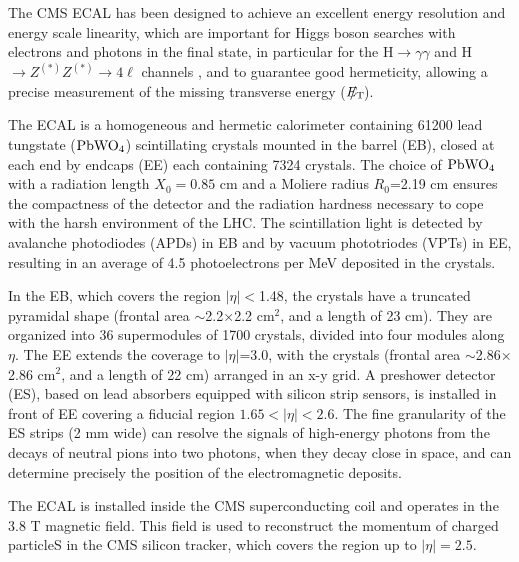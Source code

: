 \documentclass[journal]{IEEEtran}
\newcommand{\ETslash}{\ensuremath{E_{\mathrm{T}}\hspace{-1.1em}/\kern0.45em}}
\begin{document}
The CMS ECAL \cite{CMS:1997ema} has been designed to achieve an excellent energy resolution and energy scale linearity, which are important for Higgs boson searches with electrons and photons in the final state, in particular for the H$\to\gamma\gamma$ \cite{Khachatryan:2014ira} and H$\to Z^{(\ast)}Z^{(\ast)}\to 4\ell$ channels \cite{Chatrchyan:2013mxa}, and to guarantee good hermeticity, allowing a precise measurement of the missing transverse energy ($\ETslash$).

The ECAL is a homogeneous and hermetic calorimeter containing 61200 lead tungstate ($\rm PbWO_4$) scintillating crystals mounted in the barrel (EB), closed at each end by endcaps (EE) each containing 7324 crystals. The choice of $\rm PbWO_4$ with a radiation length $X_0=0.85$ cm and a Moliere radius $R_0$=2.19 cm ensures the compactness of the detector and the radiation hardness necessary to cope with the harsh environment of the LHC. The scintillation light is detected by avalanche photodiodes (APDs) in EB and by vacuum phototriodes (VPTs) in EE, resulting in an average of 4.5 photoelectrons per MeV deposited in the crystals. 

In the EB, which covers the region $\vert\eta\vert<$1.48, the crystals have a truncated pyramidal shape (frontal area $\sim$2.2$\times$2.2 cm$^2$, and a length of 23 cm). They are organized into 36 supermodules of 1700 crystals, divided into four modules along $\eta$. The EE extends the coverage to $\vert\eta\vert$=3.0, with the crystals (frontal area $\sim$2.86$\times$2.86 cm$^2$, and a length of 22 cm) arranged in an x-y grid. A preshower detector (ES), based on lead absorbers equipped with silicon strip sensors, is installed in front of EE covering a fiducial region $1.65<\vert\eta\vert<2.6$. The fine granularity of the ES strips (2 mm wide) can resolve the signals of high-energy photons from the decays of neutral pions into two photons, when they decay close in space, and can determine precisely the position of the electromagnetic deposits.

The ECAL is installed inside the CMS superconducting coil and operates in the 3.8 T magnetic field. This field is used to reconstruct the momentum of charged particleS in the CMS silicon tracker, which covers the region up to $\vert\eta\vert=2.5$.
\end{document}

